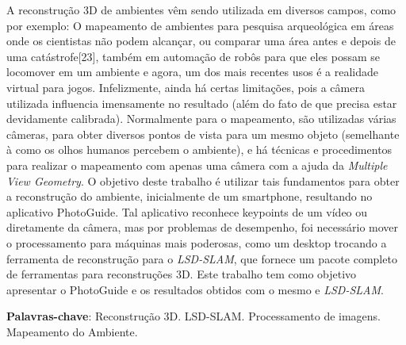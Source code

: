 \setlength{\absparsep}{18pt} %
\begin{resumo}
A reconstrução 3D de ambientes vêm sendo utilizada em diversos campos, como por exemplo: O mapeamento de ambientes para pesquisa arqueológica em áreas onde os cientistas não podem alcançar, ou comparar uma área antes e depois de uma catástrofe[23], também em automação de robôs para que eles possam se locomover em um ambiente e agora, um dos mais recentes usos é a realidade virtual para jogos. Infelizmente, ainda há certas limitações, pois a câmera utilizada influencia imensamente no resultado (além do fato de que precisa estar devidamente calibrada). Normalmente para o mapeamento, são utilizadas várias câmeras, para obter diversos pontos de vista para um mesmo objeto (semelhante à como os olhos humanos percebem o ambiente), e há técnicas e procedimentos para realizar o mapeamento com apenas uma câmera com a ajuda da \textit{Multiple View Geometry}. O objetivo deste trabalho é utilizar tais fundamentos para obter a reconstrução do ambiente, inicialmente de um smartphone, resultando no aplicativo PhotoGuide. Tal aplicativo reconhece keypoints de um vídeo ou diretamente da câmera, mas por problemas de desempenho, foi necessário mover o processamento para máquinas mais poderosas, como um desktop trocando a ferramenta de reconstrução para o \textit{LSD-SLAM}, que fornece um pacote completo de ferramentas para reconstruções 3D. Este trabalho tem como objetivo apresentar o PhotoGuide e os resultados obtidos com o mesmo e \textit{LSD-SLAM}. 


 \textbf{Palavras-chave}: Reconstrução 3D. LSD-SLAM. Processamento de imagens. Mapeamento do Ambiente.

\end{resumo}